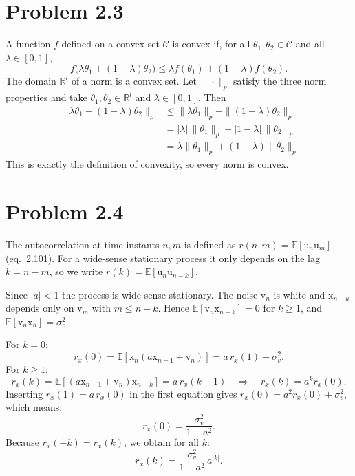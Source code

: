 \documentclass[11pt, a4paper]{article}
\begin{document}
\section*{Problem 2.3}
A function $f$ defined on a convex set $\mathcal{C}$ is convex if, for all $\theta_1,\theta_2\in\mathcal{C}$ and all $\lambda\in[0,1]$,
\begin{equation}
    f\big(\lambda\theta_1+(1-\lambda)\theta_2\big)\le \lambda f(\theta_1)+(1-\lambda)f(\theta_2).
\end{equation}
The domain $\mathbb{R}^l$ of a norm is a convex set. Let $\|\cdot\|_p$ satisfy the three norm properties and take $\theta_1,\theta_2\in\mathbb{R}^l$ and $\lambda\in[0,1]$. Then
\begin{align}
    \|\lambda\theta_1+(1-\lambda)\theta_2\|_p
    &\le \|\lambda\theta_1\|_p+\|(1-\lambda)\theta_2\|_p \nonumber\\
    &= |\lambda|\,\|\theta_1\|_p+|1-\lambda|\,\|\theta_2\|_p \nonumber\\
    &= \lambda\|\theta_1\|_p+(1-\lambda)\|\theta_2\|_p \nonumber
\end{align}
This is exactly the definition of convexity, so every norm is convex.

\section*{Problem 2.4}
The autocorrelation at time instants $n,m$ is defined as $r(n,m)=\mathbb{E}[\mathrm{u}_n\mathrm{u}_m]$ (eq.\ 2.101). For a wide-sense stationary process it only depends on the lag $k=n-m$, so we write $r(k)=\mathbb{E}[\mathrm{u}_n\mathrm{u}_{n-k}]$.

Since $|a|<1$ the process is wide-sense stationary. The noise $\mathrm{v}_n$ is white and $\mathrm{x}_{n-k}$ depends only on $\mathrm{v}_m$ with $m\le n-k$. Hence $\mathbb{E}[\mathrm{v}_n\mathrm{x}_{n-k}]=0$ for $k\ge1$, and $\mathbb{E}[\mathrm{v}_n\mathrm{x}_n]=\sigma_v^2$.

For $k=0$:
\begin{equation}
    r_x(0)=\mathbb{E}[\mathrm{x}_n(a\mathrm{x}_{n-1}+\mathrm{v}_n)]=a\,r_x(1)+\sigma_v^2 .
\end{equation}
For $k\ge1$:
\begin{equation}
    r_x(k)=\mathbb{E}[(a\mathrm{x}_{n-1}+\mathrm{v}_n)\mathrm{x}_{n-k}]=a\,r_x(k-1)\quad\Rightarrow\quad r_x(k)=a^{k}r_x(0).
\end{equation}
Inserting $r_x(1)=a\,r_x(0)$ in the first equation gives $r_x(0)=a^2r_x(0)+\sigma_v^2$, which means:
\begin{equation}
    r_x(0)=\frac{\sigma_v^2}{1-a^2}.
\end{equation}
Because $r_x(-k)=r_x(k)$, we obtain for all $k$:
\begin{equation}
    r_x(k)=\frac{\sigma_v^2}{1-a^2}\,a^{|k|}.
\end{equation}
\end{document}
